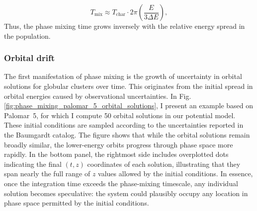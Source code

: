         \begin{equation}\label{EQ:phase_mixing}
            T_\mathrm{mix} \approx T_\mathrm{char} \cdot 2\pi \left( \frac{E}{3 \Delta E} \right),
        \end{equation}
        Thus, the phase mixing time grows inversely with the relative energy spread in the population.

        \subsubsection{Orbital drift}
            The first manifestation of phase mixing is the growth of uncertainty in orbital solutions for globular clusters over time. This originates from the initial spread in orbital energies caused by observational uncertainties. In Fig.\ref{fig:phase_mixing_palomar_5_orbital_solutions}, I present an example based on Palomar~5, for which I compute 50 orbital solutions in our potential model. These initial conditions are sampled according to the uncertainties reported in the Baumgardt catalog. The figure shows that while the orbital solutions remain broadly similar, the lower-energy orbits progress through phase space more rapidly. In the bottom panel, the rightmost side includes overplotted dots indicating the final $(t, z)$ coordinates of each solution, illustrating that they span nearly the full range of $z$ values allowed by the initial conditions. In essence, once the integration time exceeds the phase-mixing timescale, any individual solution becomes speculative: the system could plausibly occupy any location in phase space permitted by the initial conditions.


